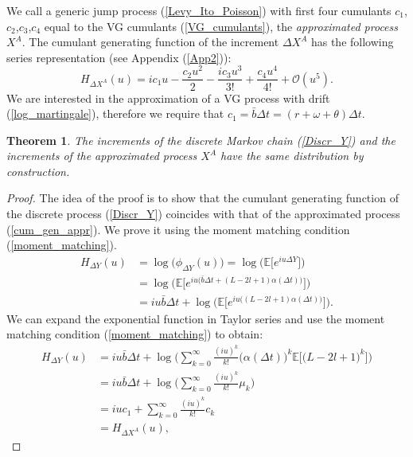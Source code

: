 \documentclass[]{interact}
\newcommand{\numberset}{\mathbb}
\newcommand{\E}{\numberset{E}}
\theoremstyle{plain}%
\newtheorem{theorem}{Theorem}[section]
\theoremstyle{definition}
\theoremstyle{remark}
\begin{document}
We call a generic jump process (\ref{Levy_Ito_Poisson}) with first four cumulants $c_1$,$c_2$,$c_3$,$c_4$ equal to the VG cumulants (\ref{VG_cumulants}), 
the \emph{approximated process} $X^A$. 
The cumulant generating function of the increment $\Delta X^A$ has the following series representation (see Appendix (\ref{App2})):
\begin{equation}\label{cum_gen_appr}
 H_{\Delta X^{A}}(u) = ic_1 u -\frac{c_2u^2}{2} -\frac{ic_3u^3}{3!} + \frac{c_4u^4}{4!} + \mathcal{O}(u^5).
\end{equation}
We are interested in the approximation of a VG process with drift (\ref{log_martingale}), therefore we require that $c_1 = \bar b \Delta t = (r+\omega+\theta)\Delta t$. 
\begin{theorem}
The increments of the discrete Markov chain (\ref{Discr_Y}) and the increments of the approximated process $X^A$ have the same distribution by construction.
\end{theorem}
\begin{proof}
The idea of the proof is to show that the cumulant generating function of the discrete process (\ref{Discr_Y}) 
coincides with that of the approximated process (\ref{cum_gen_appr}). We prove it using the moment
matching condition (\ref{moment_matching}).
\begin{align}
H_{\Delta Y}(u) &= \log \bigl( \phi_{\Delta Y}(u)  \bigr) = \log \biggl( \E \bigl[ e^{iu \Delta Y} \bigr] \biggr) \\ \nonumber
                &= \log \biggl( \E \biggl[ e^{iu \bigl( \bar b \Delta t + (L-2l+1) \alpha(\Delta t) \bigr) } \biggr] \biggr) \\ \nonumber
		&= iu \bar b \Delta t + \log \biggl( \E \biggl[ e^{iu \bigl(  (L-2l+1) \alpha(\Delta t) \bigr) } \biggr] \biggr).
\end{align}
We can expand the exponential function in Taylor series and use the moment matching condition (\ref{moment_matching}) to obtain:
\begin{align}
H_{\Delta Y}(u) &= iu \bar b \Delta t + \log \biggl( \sum_{k=0}^{\infty} \frac{(iu)^k}{k!} 
\bigl(\alpha(\Delta t)\bigr)^k \E \biggl[ \bigl( L-2l+1  \bigr)^k \biggr] \biggr) \\ \nonumber
                &= iu \bar b \Delta t + \log \biggl( \sum_{k=0}^{\infty} \frac{(iu)^k}{k!} \mu_k \biggr) \\ \nonumber
                &= iu c_1 + \sum_{k=0}^{\infty} \frac{(iu)^k}{k!} c_k \\ \nonumber 
                &= H_{\Delta X^{A}}(u),
\end{align}
\end{proof}
\end{document}

